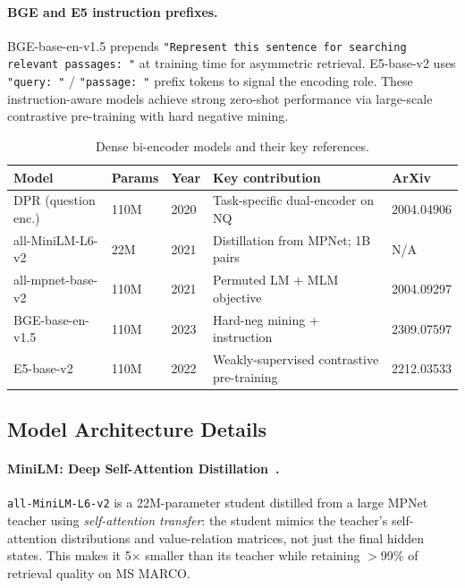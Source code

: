 \documentclass[12pt, a4paper]{article}
\begin{document}
\paragraph{BGE and E5 instruction prefixes.}
BGE-base-en-v1.5 prepends \texttt{"Represent this sentence for searching
relevant passages: "} at training time for asymmetric retrieval.
E5-base-v2 uses \texttt{"query: "} / \texttt{"passage: "} prefix tokens to
signal the encoding role.  These instruction-aware models achieve strong
zero-shot performance via large-scale contrastive pre-training with hard
negative mining.

\begin{table}[h]
\centering
\caption{Dense bi-encoder models and their key references.}
\label{tab:dense_model_refs}
\begin{tabular}{lllll}
\toprule
\textbf{Model} & \textbf{Params} & \textbf{Year} & \textbf{Key contribution} & \textbf{ArXiv} \\
\midrule
DPR (question enc.)      & 110M & 2020 & Task-specific dual-encoder on NQ  & 2004.04906 \\
all-MiniLM-L6-v2         & 22M  & 2021 & Distillation from MPNet; 1B pairs  & N/A \\
all-mpnet-base-v2         & 110M & 2021 & Permuted LM + MLM objective        & 2004.09297 \\
BGE-base-en-v1.5          & 110M & 2023 & Hard-neg mining + instruction      & 2309.07597 \\
E5-base-v2                & 110M & 2022 & Weakly-supervised contrastive pre-training & 2212.03533 \\
\bottomrule
\end{tabular}
\end{table}

\subsection{Model Architecture Details}

\paragraph{MiniLM: Deep Self-Attention Distillation~\citep{wang2020minilm}.}
\texttt{all-MiniLM-L6-v2} is a 22M-parameter student distilled from a large
MPNet teacher using \emph{self-attention transfer}: the student mimics the
teacher's self-attention distributions and value-relation matrices, not just
the final hidden states.  This makes it 5$\times$ smaller than its teacher
while retaining $>$99\% of retrieval quality on MS MARCO.
\end{document}
